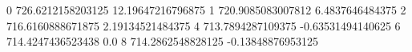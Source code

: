 0 726.6212158203125 12.19647216796875
1 720.9085083007812 6.4837646484375
2 716.6160888671875 2.19134521484375
4 713.7894287109375 -0.63531494140625
6 714.4247436523438 0.0
8 714.2862548828125 -0.13848876953125
